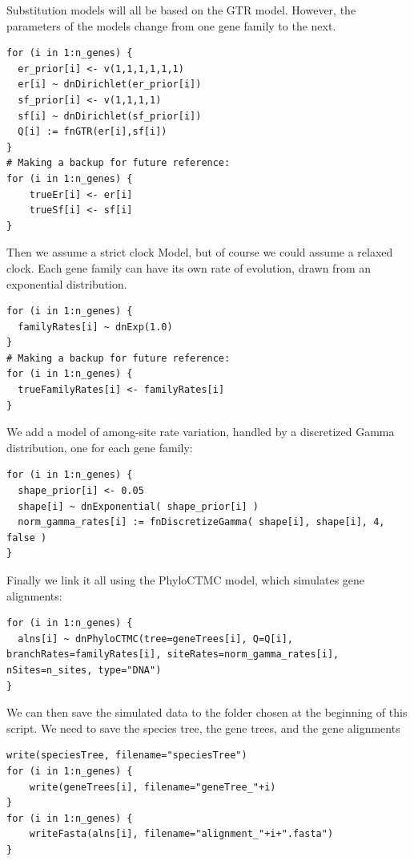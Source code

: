 \documentclass[11pt]{article}
\begin{document}
{\begin{framed}
Substitution models will all be based on the GTR model. However, the parameters of the models change from one gene family to the next.
 {\tt \begin{snugshade*}
\begin{lstlisting}
for (i in 1:n_genes) {
  er_prior[i] <- v(1,1,1,1,1,1)
  er[i] ~ dnDirichlet(er_prior[i])
  sf_prior[i] <- v(1,1,1,1)
  sf[i] ~ dnDirichlet(sf_prior[i])
  Q[i] := fnGTR(er[i],sf[i]) 
}
# Making a backup for future reference:
for (i in 1:n_genes) {
	trueEr[i] <- er[i]
	trueSf[i] <- sf[i]
}
\end{lstlisting}
\end{snugshade*}}

Then we assume a strict clock Model, but of course we could assume a relaxed clock.
Each gene family can have its own rate of evolution, drawn from an exponential distribution.
 {\tt \begin{snugshade*}
\begin{lstlisting}
for (i in 1:n_genes) {
  familyRates[i] ~ dnExp(1.0)
}
# Making a backup for future reference:
for (i in 1:n_genes) {
  trueFamilyRates[i] <- familyRates[i] 
}
\end{lstlisting}
\end{snugshade*}}

We add a model of among-site rate variation, handled by a discretized Gamma distribution, one for each gene family:

 {\tt \begin{snugshade*}
\begin{lstlisting}
for (i in 1:n_genes) {
  shape_prior[i] <- 0.05 
  shape[i] ~ dnExponential( shape_prior[i] )
  norm_gamma_rates[i] := fnDiscretizeGamma( shape[i], shape[i], 4, false )
}
\end{lstlisting}
\end{snugshade*}}

Finally we link it all using the PhyloCTMC model, which simulates gene alignments:

 {\tt \begin{snugshade*}
\begin{lstlisting}
for (i in 1:n_genes) {
  alns[i] ~ dnPhyloCTMC(tree=geneTrees[i], Q=Q[i],  branchRates=familyRates[i], siteRates=norm_gamma_rates[i], nSites=n_sites, type="DNA")
}
\end{lstlisting}
\end{snugshade*}}
We can then save the simulated data to the folder chosen at the beginning of this script.
We need to save the species tree, the gene trees, and the gene alignments

 {\tt \begin{snugshade*}
\begin{lstlisting}
write(speciesTree, filename="speciesTree")
for (i in 1:n_genes) {
	write(geneTrees[i], filename="geneTree_"+i)
}
for (i in 1:n_genes) {
	writeFasta(alns[i], filename="alignment_"+i+".fasta")
}
\end{lstlisting}
\end{snugshade*}}
\end{framed}}
\end{document}
